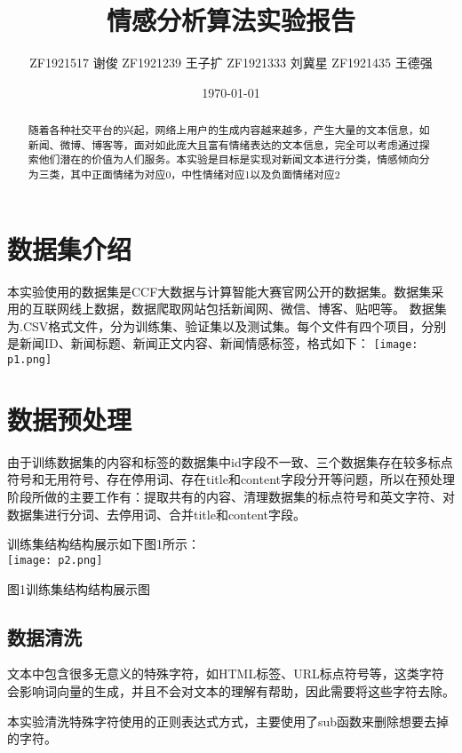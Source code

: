 \documentclass[twocolumn]{ctexart}
\begin{document}
\title{情感分析算法实验报告}
\author{ZF1921517 谢俊 ZF1921239 王子扩 ZF1921333 刘冀星 ZF1921435 王德强}
\date{\today}
\maketitle



\begin{abstract}
随着各种社交平台的兴起，网络上用户的生成内容越来越多，产生大量的文本信息，如新闻、微博、博客等，面对如此庞大且富有情绪表达的文本信息，完全可以考虑通过探索他们潜在的价值为人们服务。本实验是目标是实现对新闻文本进行分类，情感倾向分为三类，其中正面情绪为对应0，中性情绪对应1以及负面情绪对应2
\end{abstract}



\section{数据集介绍}

本实验使用的数据集是CCF大数据与计算智能大赛官网公开的数据集。数据集采用的互联网线上数据，数据爬取网站包括新闻网、微信、博客、贴吧等。
数据集为.CSV格式文件，分为训练集、验证集以及测试集。每个文件有四个项目，分别是新闻ID、新闻标题、新闻正文内容、新闻情感标签，格式如下：
\texttt{[image: p1.png]}


\section{数据预处理}
由于训练数据集的内容和标签的数据集中id字段不一致、三个数据集存在较多标点符号和无用符号、存在停用词、存在title和content字段分开等问题，所以在预处理阶段所做的主要工作有：提取共有的内容、清理数据集的标点符号和英文字符、对数据集进行分词、去停用词、合并title和content字段。
\par 训练集结构结构展示如下图1所示：\\
\texttt{[image: p2.png]}
\caption{图1训练集结构结构展示图}
\label{fig:label}

\subsection{数据清洗}
\par 文本中包含很多无意义的特殊字符，如HTML标签、URL标点符号等，这类字符会影响词向量的生成，并且不会对文本的理解有帮助，因此需要将这些字符去除。

\par 本实验清洗特殊字符使用的正则表达式方式，主要使用了sub函数来删除想要去掉的字符。
\end{document}
